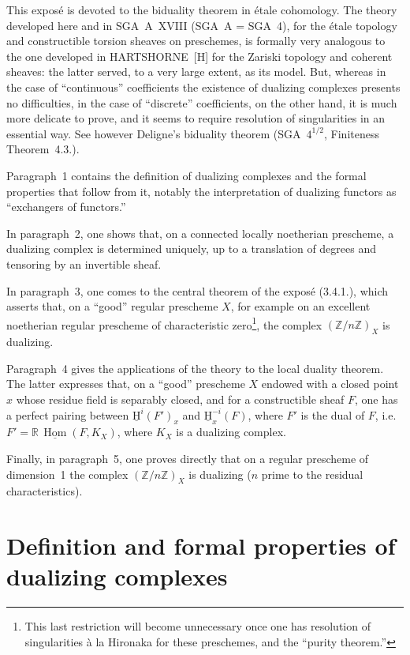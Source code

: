 \documentclass[11pt]{article}
\renewcommand{\H}{\mathrm{H}}
\DeclareMathOperator{\Hom}{Hom}
\newcommand{\Z}{\mathbb{Z}}
\providecommand{\Hom}{\operatorname{Hom}}
\providecommand{\Z}{\mathbb Z}
\providecommand{\Hom}{\operatorname{Hom}}
\begin{document}
This exposé is devoted to the biduality theorem in étale cohomology. The theory developed here and in SGA~A~XVIII (SGA~A = SGA~4), for the étale topology and constructible torsion sheaves on preschemes, is formally very analogous to the one developed in HARTSHORNE~[H] for the Zariski topology and coherent sheaves: the latter served, to a very large extent, as its model. But, whereas in the case of ``continuous'' coefficients the existence of dualizing complexes presents no difficulties, in the case of ``discrete'' coefficients, on the other hand, it is much more delicate to prove, and it seems to require resolution of singularities in an essential way. See however Deligne's biduality theorem (SGA~$4^{1/2}$, Finiteness Theorem~4.3.).

Paragraph~1 contains the definition of dualizing complexes and the formal properties that follow from it, notably the interpretation of dualizing functors as ``exchangers of functors.''

In paragraph~2, one shows that, on a connected locally noetherian prescheme, a dualizing complex is determined uniquely, up to a translation of degrees and tensoring by an invertible sheaf.

In paragraph~3, one comes to the central theorem of the exposé (3.4.1.), which asserts that, on a ``good'' regular prescheme $X$, for example on an excellent noetherian regular prescheme of characteristic zero\footnote{This last restriction will become unnecessary once one has resolution of singularities à la Hironaka for these preschemes, and the ``purity theorem.''}, the complex $(\Z/n\Z)_X$ is dualizing.

Paragraph~4 gives the applications of the theory to the local duality theorem. The latter expresses that, on a ``good'' prescheme $X$ endowed with a closed point $x$ whose residue field is separably closed, and for a constructible sheaf $F$, one has a perfect pairing between $\underline{\H}^i(F')_x$ and $\underline{\H}^{-i}_x(F)$, where $F'$ is the dual of $F$, i.e.\ $F' = \mathbb{R}\,\underline{\Hom}(F,K_X)$, where $K_X$ is a dualizing complex.

Finally, in paragraph~5, one proves directly that on a regular prescheme of dimension~1 the complex $(\Z/n\Z)_X$ is dualizing ($n$ prime to the residual characteristics).

\section{Definition and formal properties of dualizing complexes}
\end{document}
